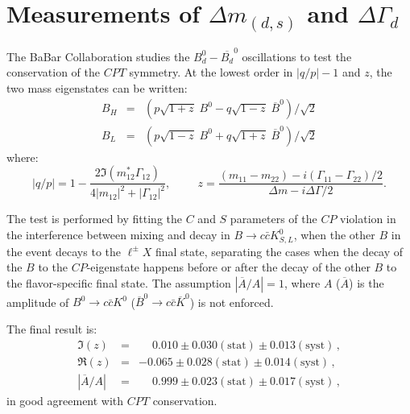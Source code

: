 \section{Measurements of $\Delta m_{(d,s)}$ and $\Delta\Gamma_d$}
\label{sec:dmdgd}


The BaBar Collaboration studies the $B_d^0-\overline{B_d}^0$ oscillations to
test the conservation of the $CPT$ symmetry\cite{babar_cpt}. At the lowest order in $|q/p|-1$
and $z$, the two mass eigenstates can be written:
\begin{eqnarray}
B_H & = & (p\sqrt{1+z} \; B^0 - q\sqrt{1-z} \; \overline{B}^0) / \sqrt{2} \\
B_L & = & (p\sqrt{1-z} \; B^0 + q\sqrt{1+z} \; \overline{B}^0) / \sqrt{2} 
\end{eqnarray}
where:
\begin{equation}
  |q/p| = 1 - \frac{2 \Im(m_{12}^* \Gamma_{12})}{4|m_{12}|^2 + |\Gamma_{12}|^2}, \hspace{1cm}
  z = \frac{(m_{11}-m_{22}) - i (\Gamma_{11} - \Gamma_{22})/2}{\Delta m - i \Delta \Gamma /2}.
\end{equation}

The test is performed by fitting the $C$ and $S$ parameters of the $CP$ violation in the
interference between mixing and decay in $B \to c\bar{c} K^0_{S,L}$, when the other $B$
in the event decays to the $\ell^{\pm}X$ final state, separating the cases when the decay
of the $B$ to the $CP$-eigenstate happens before or after the decay of the other $B$ to
the flavor-specific final state. The assumption $|\overline{A}/A|=1$, where $A$ ($\overline{A}$)
is the amplitude of $B^0 \to c\bar{c} K^0$ ($\overline{B}^0 \to c\bar{c} \overline{K}^0$) is
not enforced.

The final result is:
\begin{eqnarray}
  \Im (z) & = &\phantom{-} 0.010 \pm 0.030 (\mbox{stat}) \pm 0.013 (\mbox{syst}) \, ,\\
  \Re (z) & = & -0.065 \pm 0.028 (\mbox{stat}) \pm 0.014 (\mbox{syst}) \, ,\\
  |\overline{A}/{A}| & = & \phantom{-} 0.999 \pm 0.023 (\mbox{stat}) \pm 0.017 (\mbox{syst}) \, ,
\end{eqnarray}
in good agreement with $CPT$ conservation.
  
